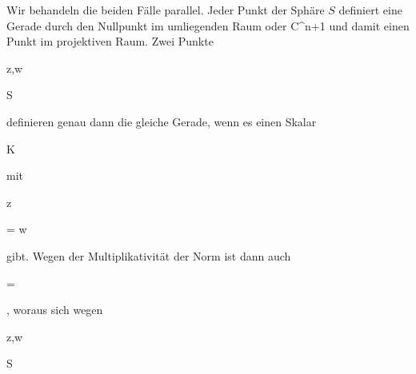 {


Wir behandeln die beiden Fälle parallel. Jeder Punkt der Sphäre $S$ definiert eine
 {} {}
Gerade durch den Nullpunkt im umliegenden Raum   {  oder  }  {  {\mathbb C}^{n+1}   }{ } und damit einen Punkt im projektiven Raum. Zwei Punkte


\mavergleichskette

{\vergleichskette

{z,w
}

{ \in }{ S
}

{  }{
}

{    }{
}

{   }{
}

}
{}{}{}
definieren genau dann die gleiche Gerade, wenn es einen Skalar


\mavergleichskette

{\vergleichskette

{ \lambda
}

{ \in }{ {\mathbb K}
}

{  }{
}

{    }{
}

{   }{
}

}
{}{}{}
mit


\mavergleichskette

{\vergleichskette

{ z
}

{ = }{ \lambda w
}

{  }{
}

{    }{
}

{   }{
}

}
{}{}{}
gibt. Wegen der Multiplikativität der Norm ist dann auch


\mavergleichskette

{\vergleichskette

{  \Vert
}

{ = }{ \betrag {  \lambda } \cdot {} \Vert
}

{  }{
}

{    }{
}

{   }{
}

}
{}{}{,}
woraus sich wegen


\mavergleichskette

{\vergleichskette

{z,w
}

{ \in }{ S
}

{  }{
}

{    }{
}

}}
